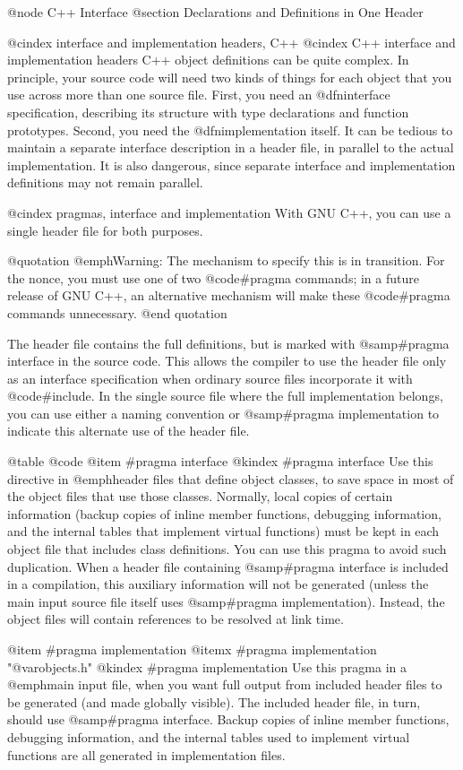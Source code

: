 {{{{{@node C++ Interface
@section Declarations and Definitions in One Header

@cindex interface and implementation headers, C++
@cindex C++ interface and implementation headers
C++ object definitions can be quite complex.  In principle, your source
code will need two kinds of things for each object that you use across
more than one source file.  First, you need an @dfn{interface}
specification, describing its structure with type declarations and
function prototypes.  Second, you need the @dfn{implementation} itself.
It can be tedious to maintain a separate interface description in a
header file, in parallel to the actual implementation.  It is also
dangerous, since separate interface and implementation definitions may
not remain parallel.

@cindex pragmas, interface and implementation
With GNU C++, you can use a single header file for both purposes.

@quotation
@emph{Warning:} The mechanism to specify this is in transition.  For the
nonce, you must use one of two @code{#pragma} commands; in a future
release of GNU C++, an alternative mechanism will make these
@code{#pragma} commands unnecessary.
@end quotation

The header file contains the full definitions, but is marked with
@samp{#pragma interface} in the source code.  This allows the compiler
to use the header file only as an interface specification when ordinary
source files incorporate it with @code{#include}.  In the single source
file where the full implementation belongs, you can use either a naming
convention or @samp{#pragma implementation} to indicate this alternate
use of the header file.

@table @code
@item #pragma interface
@kindex #pragma interface
Use this directive in @emph{header files} that define object classes, to save
space in most of the object files that use those classes.  Normally,
local copies of certain information (backup copies of inline member
functions, debugging information, and the internal tables that implement
virtual functions) must be kept in each object file that includes class
definitions.  You can use this pragma to avoid such duplication.  When a
header file containing @samp{#pragma interface} is included in a
compilation, this auxiliary information will not be generated (unless
the main input source file itself uses @samp{#pragma implementation}).
Instead, the object files will contain references to be resolved at link
time.

@item #pragma implementation
@itemx #pragma implementation "@var{objects}.h"
@kindex #pragma implementation
Use this pragma in a @emph{main input file}, when you want full output from
included header files to be generated (and made globally visible).  The
included header file, in turn, should use @samp{#pragma interface}.
Backup copies of inline member functions, debugging information, and the
internal tables used to implement virtual functions are all generated in
implementation files.

}}}}}
